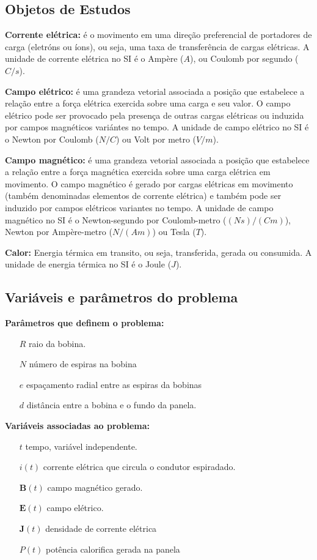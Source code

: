 \documentclass[
	article,			%
	11pt,				%
	oneside,			%
	a4paper,			%
	english,			%
	brazil,				%
	sumario=tradicional
	]{abntex2}
\begin{document}
\subsection{Objetos de Estudos}

\textbf{Corrente elétrica:} é o movimento em uma direção preferencial de portadores de carga (eletróns ou íons), ou seja, uma taxa de transferência de cargas elétricas. A unidade de corrente elétrica no SI é o Ampère ($ A $), ou Coulomb por segundo ($ C/s $).

\textbf{Campo elétrico:} é uma grandeza vetorial associada a posição que estabelece a relação entre a força elétrica exercida sobre uma carga e seu valor. O campo elétrico pode ser provocado pela presença de outras cargas elétricas ou induzida por campos magnéticos variántes no tempo. A unidade de campo elétrico no SI é o Newton por Coulomb ($ N/C $) ou Volt por metro ($ V/m $).

\textbf{Campo magnético:} é uma grandeza vetorial associada a posição que estabelece a relação entre a força magnética exercida sobre uma carga elétrica em movimento. O campo magnético é gerado por cargas elétricas em movimento (também denominadas elementos de corrente elétrica) e também pode ser induzido por campos elétricos variantes no tempo. A unidade de campo magnético no SI é o Newton-segundo por Coulomb-metro ($ (Ns)/(Cm) $), Newton por Ampère-metro ($ N/(Am) $) ou Tesla ($ T $).

\textbf{Calor:} Energia térmica em transito, ou seja, transferida, gerada ou consumida. A unidade de energia térmica no SI é o Joule ($ J $).

\subsection{Variáveis e parâmetros do problema}

\textbf{Parâmetros que definem o problema:}

\begin{itemize}
	\item[$ R $] raio da bobina.
	\item[$ N $] número de espiras na bobina
	\item[$ e $] espaçamento radial entre as espiras da bobinas
	\item[$ d $] distância entre a bobina e o fundo da panela.
\end{itemize}

\textbf{Variáveis associadas ao problema:}

\begin{itemize}
	\item[$ t $] tempo, variável independente.
	\item[$ i(t) $] corrente elétrica que circula o condutor espiradado.
	\item[$ \textbf{B}(t) $] campo magnético gerado.
	\item[$ \textbf{E}(t) $] campo elétrico.
	\item[$ \textbf{J}(t) $] densidade de corrente elétrica
	\item[$ P(t) $] potência calorifica gerada na panela
\end{itemize}
\end{document}

